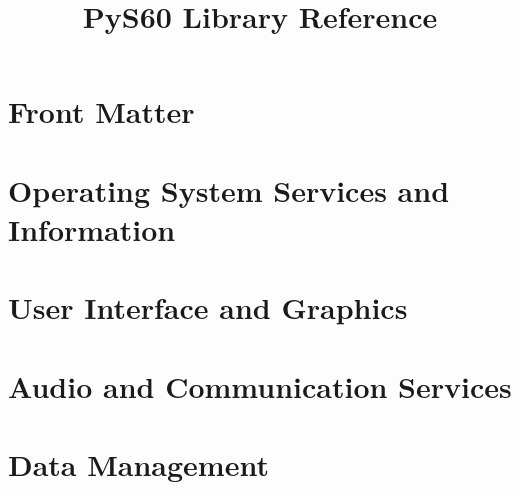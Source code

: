 \documentclass{manual}
\title{PyS60 Library Reference}
\begin{document}
\maketitle

\ifhtml
\chapter*{Front Matter\label{front}}
\fi


\begin{abstract}
\noindent

\end{abstract}

\tableofcontents




\chapter{Operating System Services and Information \label{s60os}}




\chapter{User Interface and Graphics \label{s60graph}}











\chapter{Audio and Communication Services \label{s60ac}}








\chapter{Data Management \label{s60data}}
\end{document}
